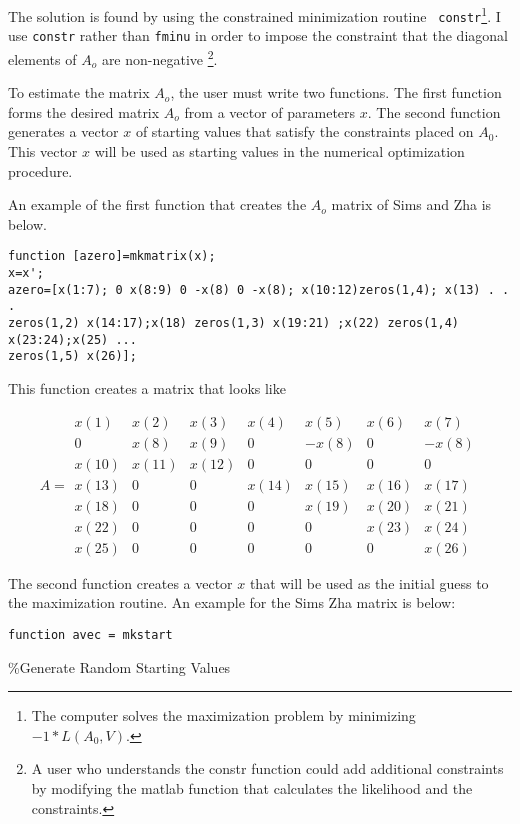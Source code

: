 \documentclass{article}
\begin{document}
The solution is found by using the constrained minimization routine \texttt{%
constr}\footnote{%
The computer solves the maximization problem by minimizing $-1\ast
L(A_{0},V).$}. I use \texttt{constr} rather than \texttt{fminu} in order to
impose the constraint that the diagonal elements of $A_{o}$ are non-negative%
\footnote{%
A user who understands the constr function could add additional constraints
by modifying the matlab function that calculates the likelihood and the
constraints.}.

To estimate the matrix $A_{o}$, the user must write two functions. The first
function forms the desired matrix $A_{o}$ from a vector of parameters $x$.
The second function generates a vector $x$ of starting values that satisfy
the constraints placed on $A_{0}.$ This vector $x$ will be used as starting
values in the numerical optimization procedure.

An example of the first function that creates the $A_{o}$ matrix of Sims and
Zha is below.
\begin{verbatim}
function [azero]=mkmatrix(x);
x=x';
azero=[x(1:7); 0 x(8:9) 0 -x(8) 0 -x(8); x(10:12)zeros(1,4); x(13) . . .
zeros(1,2) x(14:17);x(18) zeros(1,3) x(19:21) ;x(22) zeros(1,4) x(23:24);x(25) ...
zeros(1,5) x(26)];
\end{verbatim}

This function creates a matrix that looks like

\begin{equation*}
A= 
\begin{array}{ccccccc}
x(1) & x(2) & x(3) & x(4) & x(5) & x(6) & x(7) \\ 
0 & x(8) & x(9) & 0 & -x(8) & 0 & -x(8) \\ 
x(10) & x(11) & x(12) & 0 & 0 & 0 & 0 \\ 
x(13) & 0 & 0 & x(14) & x(15) & x(16) & x(17) \\ 
x(18) & 0 & 0 & 0 & x(19) & x(20) & x(21) \\ 
x(22) & 0 & 0 & 0 & 0 & x(23) & x(24) \\ 
x(25) & 0 & 0 & 0 & 0 & 0 & x(26)
\end{array}
\end{equation*}

The second function creates a vector $x$ that will be used as the initial
guess to the maximization routine. An example for the Sims Zha matrix is
below:

\texttt{function avec = mkstart}

\%Generate Random Starting Values
\end{document}
